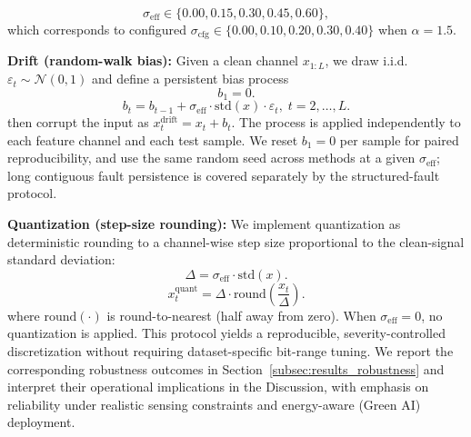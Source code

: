 ﻿\documentclass[review,1p,times]{elsarticle}
\begin{document}
\begin{equation}
\sigma_{\mathrm{eff}} \in \{0.00, 0.15, 0.30, 0.45, 0.60\},
\end{equation}
which corresponds to configured $\sigma_{\mathrm{cfg}}\in\{0.00,0.10,0.20,0.30,0.40\}$ when $\alpha=1.5$.

\noindent\textbf{Drift (random-walk bias):}
Given a clean channel $x_{1:L}$, we draw i.i.d.\ $\varepsilon_t\sim\mathcal{N}(0,1)$ and define a persistent bias process
\begin{equation}
b_1 = 0.
\end{equation}
\begin{equation}
b_t = b_{t-1} + \sigma_{\mathrm{eff}}\cdot \mathrm{std}(x)\cdot \varepsilon_t,\; t=2,\dots,L.
\end{equation}
then corrupt the input as $x^{\text{drift}}_t = x_t + b_t$. The process is applied independently to each feature channel and each test sample. We reset $b_1=0$ per sample for paired reproducibility, and use the same random seed across methods at a given $\sigma_{\mathrm{eff}}$; long contiguous fault persistence is covered separately by the structured-fault protocol.

\noindent\textbf{Quantization (step-size rounding):}
We implement quantization as deterministic rounding to a channel-wise step size proportional to the clean-signal standard deviation:
\begin{equation}
\Delta = \sigma_{\mathrm{eff}}\cdot \mathrm{std}(x).
\end{equation}
\begin{equation}
x^{\text{quant}}_t = \Delta\cdot \mathrm{round}\!\left(\frac{x_t}{\Delta}\right).
\end{equation}
where $\mathrm{round}(\cdot)$ is round-to-nearest (half away from zero). When $\sigma_{\mathrm{eff}}=0$, no quantization is applied. This protocol yields a reproducible, severity-controlled discretization without requiring dataset-specific bit-range tuning. We report the corresponding robustness outcomes in Section~\ref{subsec:results_robustness} and interpret their operational implications in the Discussion, with emphasis on reliability under realistic sensing constraints and energy-aware (Green AI) deployment.
\end{document}
